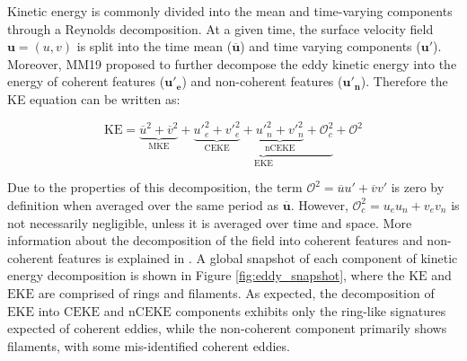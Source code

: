 \documentclass[draft,linenumbers]{agujournal2019}
\newcommand{\mKE}{\textrm{MKE}}
\newcommand{\KE}{\textrm{KE}}
\newcommand{\EKE}{\textrm{EKE}}
\newcommand{\CEKE}{\textrm{CEKE}}
\newcommand{\nCEKE}{\textrm{nCEKE}}
\begin{document}
	Kinetic energy is commonly divided into the mean and time-varying components through a Reynolds decomposition. At a given time, the surface velocity field $\mathbf{u} = (u,v)$ is split into the time mean ($\mathbf{\overline{u}}$) and time varying components ($\mathbf{u'}$). Moreover, MM19 proposed to further decompose the eddy kinetic energy into the energy of coherent features ($\mathbf{u'_e}$) and non-coherent features ($\mathbf{u'_n}$). Therefore the KE equation can be written as:
	
	\begin{equation}
		\mathrm{KE} = \underbrace{\overline{u}^2 + \overline{v}^2}_{\mKE} + 
		\underbrace{\underbrace{{u'}_e^2+{v'}_e^2}_{\CEKE}  + \underbrace{{u'}_n^2+{v'}_n^2}_{\nCEKE} + \mathcal{O}_c^2 }_{\EKE} + \mathcal{O}^2
	\end{equation}

	Due to the properties of this decomposition, the term $\mathcal{O}^2 = \overline{u}u'+\overline{v}v'$ is zero by definition when averaged over the same period as $\mathbf{\overline{u}}$. However, $\mathcal{O}_c^2 = u_eu_n+v_ev_n$ is not necessarily negligible, unless it is averaged over time and space. More information about the decomposition of the field into coherent features and non-coherent features is explained in \citet{Martinez_TKE_2019}. A global snapshot of each component of kinetic energy decomposition is shown in Figure \ref{fig:eddy_snapshot}, where the $\KE$ and $\EKE$ are comprised of rings and filaments. As expected, the decomposition of $\EKE$ into $\CEKE$ and $\nCEKE$ components exhibits only the ring-like signatures expected of coherent eddies, while the non-coherent component primarily shows filaments, with some mis-identified coherent eddies.
\end{document}
